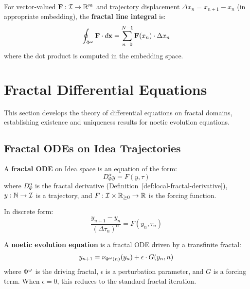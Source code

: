 \begin{definition}
\label{def:fractal-line-integral}
For vector-valued $\mathbf{F} : \mathcal{I} \to \mathbb{R}^m$ and trajectory displacement $\Delta x_n = x_{n+1} - x_n$ (in appropriate embedding), the \textbf{fractal line integral} is:
\[
\oint_{\Phi^{\omega}} \mathbf{F} \cdot d\mathbf{x} = \sum_{n=0}^{N-1} \mathbf{F}(x_n) \cdot \Delta x_n
\]
where the dot product is computed in the embedding space.
\end{definition}

\section{Fractal Differential Equations}
\label{sec:fractal-odes}

\begin{tcolorbox}[colback=blue!5!white,colframe=blue!75!black,title=\vnewthree]
This section develops the theory of differential equations on fractal domains, establishing existence and uniqueness results for noetic evolution equations.
\end{tcolorbox}

\subsection{Fractal ODEs on Idea Trajectories}

\begin{definition}
\label{def:fractal-ode}
A \textbf{fractal ODE} on Idea space is an equation of the form:
\[
D^\alpha_\Phi y = F(y, \tau)
\]
where $D^\alpha_\Phi$ is the fractal derivative (Definition~\ref{def:local-fractal-derivative}), $y : \mathbb{N} \to \mathcal{I}$ is a trajectory, and $F : \mathcal{I} \times \mathbb{R}_{\geq 0} \to \mathbb{R}$ is the forcing function.

In discrete form:
\[
\frac{y_{n+1} - y_n}{(\Delta\tau_n)^\alpha} = F(y_n, \tau_n)
\]
\end{definition}

\begin{definition}
\label{def:noetic-evolution}
A \textbf{noetic evolution equation} is a fractal ODE driven by a transfinite fractal:
\[
y_{n+1} = \nu_{\Phi^{\omega}(n)}(y_n) + \epsilon \cdot G(y_n, n)
\]
where $\Phi^{\omega}$ is the driving fractal, $\epsilon$ is a perturbation parameter, and $G$ is a forcing term. When $\epsilon = 0$, this reduces to the standard fractal iteration.
\end{definition}

